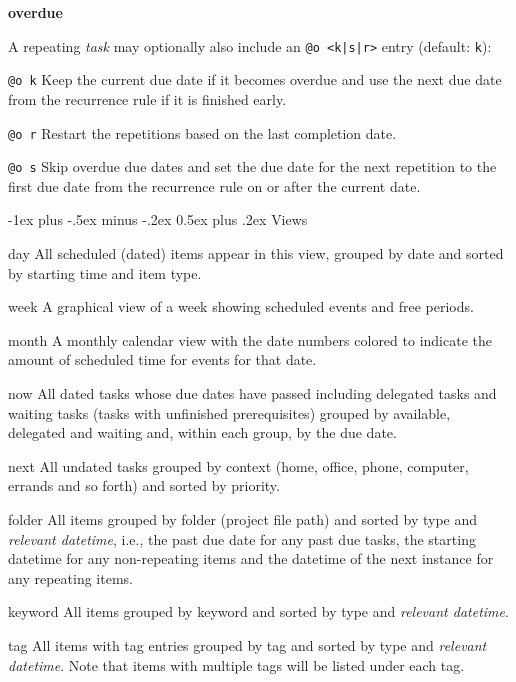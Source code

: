 \documentclass[10pt,landscape]{article}
\makeatletter
\renewcommand{\section}{\@startsection{section}{1}{0mm}%
                                {-1ex plus -.5ex minus -.2ex}%
                                {0.5ex plus .2ex}%
                                {\normalfont\large\bfseries}}
\makeatother
\begin{document}
\begin{multicols}{3}
\textbf{overdue}

A repeating \emph{task} may optionally also include an \verb!@o <k|s|r>! entry (default: \verb'k'):

\begin{compactdesc}
   \item[\texttt{@o k}] Keep the current due date if it becomes overdue and use the next due date from the recurrence rule if it is finished early.
   \item[\texttt{@o r}] Restart the repetitions based on the last completion date.
   \item[\texttt{@o s}] Skip overdue due dates and set the due date for the next repetition to the first due date from the recurrence rule on or after the current date.
\end{compactdesc}


\section{Views}

\begin{compactdesc}
  \item[day] All scheduled (dated) items appear in this view, grouped by date and sorted by starting time and item type.
  \item[week] A graphical view of a week showing scheduled events and free periods.
  \item[month] A monthly calendar view with the date numbers colored to indicate the amount of scheduled time for events for that date.
  \item[now] All dated tasks whose due dates have passed including delegated tasks and waiting tasks (tasks with unfinished prerequisites) grouped by available, delegated and waiting and, within each group, by the due date.
  \item[next] All undated tasks grouped by context (home, office, phone, computer, errands and so forth) and sorted by priority.
  \item[folder] All items grouped by folder (project file path) and sorted by type and \emph{relevant datetime}, i.e., the past due date for any past due tasks, the starting datetime for any non-repeating items and the datetime of the next instance for any repeating items.
  \item[keyword] All items grouped by keyword and sorted by type and \emph{relevant datetime}.
  \item[tag] All items with tag entries grouped by tag and sorted by type and \emph{relevant datetime}. Note that items with multiple tags will be listed under each tag.
\end{compactdesc}


\end{multicols}
\end{document}
